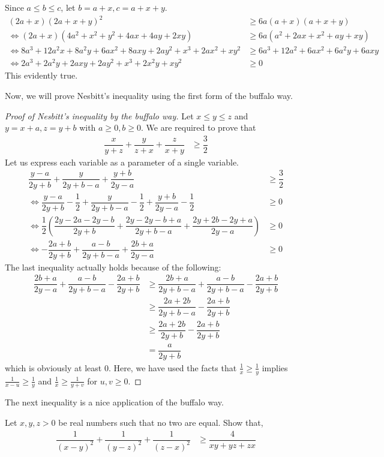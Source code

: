 \documentclass{subfile}
\begin{document}
		\begin{solution}
			Since $a\leq b\leq c$, let $b=a+x,c=a+x+y$.
				\begin{align*}
					(2a+x)(2a+x+y)^2
						& \geq6a(a+x)(a+x+y)\\
					\iff(2a+x)(4a^2+x^2+y^2+4ax+4ay+2xy)
						& \geq6a(a^2+2ax+x^2+ay+xy)\\
					\iff8a^3+12a^2x+8a^2y+6ax^2+8axy+2ay^2+x^3+2ax^2+xy^2
						& \geq6a^3+12a^2+6ax^2+6a^2y+6axy\\
					\iff 2a^3+2a^2y+2axy+2ay^2+x^3+2x^2y+xy^2
						& \geq0
				\end{align*}
			This evidently true.
		\end{solution}
	Now, we will prove Nesbitt's inequality using the first form of the buffalo way.
		\begin{proof}[Proof of Nesbitt's inequality by the buffalo way]
			Let $x\leq y\leq z$ and $y=x+a,z=y+b$ with $a\geq0,b\geq0$. We are required to prove that
				\begin{align*}
					\dfrac{x}{y+z}+\dfrac{y}{z+x}+\dfrac{z}{x+y}
						& \geq\dfrac{3}{2}
				\end{align*}
			Let us express each variable as a parameter of a single variable.
				\begin{align*}
					\dfrac{y-a}{2y+b}+\dfrac{y}{2y+b-a}+\dfrac{y+b}{2y-a}
						& \geq\dfrac{3}{2}\\
					\iff\dfrac{y-a}{2y+b}-\dfrac{1}{2}+\dfrac{y}{2y+b-a}-\dfrac{1}{2}+\dfrac{y+b}{2y-a}-\dfrac{1}{2}
						& \geq0\\
					\iff\dfrac{1}{2}\left(\dfrac{2y-2a-2y-b}{2y+b}+\dfrac{2y-2y-b+a}{2y+b-a}+\dfrac{2y+2b-2y+a}{2y-a}\right)
						& \geq0\\
					\iff-\dfrac{2a+b}{2y+b}+\dfrac{a-b}{2y+b-a}+\dfrac{2b+a}{2y-a}
						& \geq0
				\end{align*}
			The last inequality actually holds because of the following:
				\begin{align*}
					\dfrac{2b+a}{2y-a}+\dfrac{a-b}{2y+b-a}-\dfrac{2a+b}{2y+b}
						& \geq\dfrac{2b+a}{2y+b-a}+\dfrac{a-b}{2y+b-a}-\dfrac{2a+b}{2y+b}\\
						& \geq\dfrac{2a+2b}{2y+b-a}-\dfrac{2a+b}{2y+b}\\
						& \geq\dfrac{2a+2b}{2y+b}-\dfrac{2a+b}{2y+b}\\
						& = \dfrac{a}{2y+b}
				\end{align*}
			which is obviously at least $0$. Here, we have used the facts that $\frac{1}{x}\geq\frac{1}{y}$ implies $\frac{1}{x-u}\geq\frac{1}{y}$ and $\frac{1}{x}\geq\frac{1}{y+v}$ for $u,v\geq0$.
		\end{proof}
	The next inequality is a nice application of the buffalo way.
		\begin{problem}
			Let $x,y,z>0$ be real numbers such that no two are equal. Show that,
				\begin{align*}
					\dfrac{1}{(x-y)^2}+\dfrac{1}{(y-z)^2}+\dfrac{1}{(z-x)^2}
						& \geq\dfrac{4}{xy+yz+zx}
				\end{align*}
		\end{problem}
	
\end{document}
